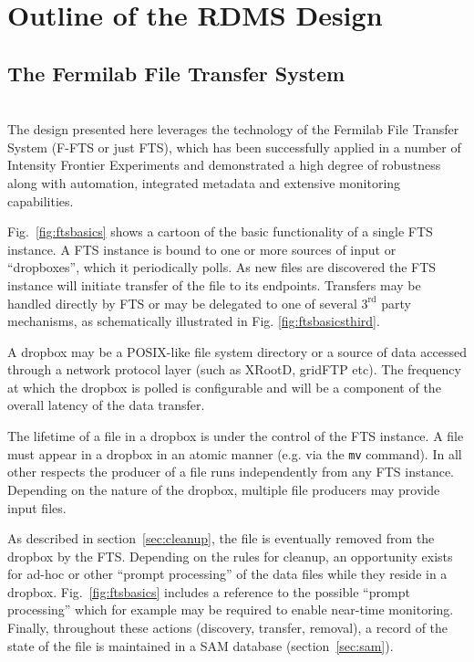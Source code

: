 \documentclass[12pt]{article}
\begin{document}
 





\section{Outline of the RDMS Design}


\subsection{The Fermilab File Transfer System}
\ \\
The design presented here leverages the technology of the Fermilab
File Transfer System (F-FTS or just FTS), which has been successfully
applied in a number of Intensity Frontier Experiments and demonstrated
a high degree of robustness along with automation, integrated metadata
and extensive monitoring capabilities.

Fig.~\ref{fig:ftsbasics} shows a cartoon of the basic functionality
of a single FTS instance.  A FTS instance is bound to one or more
sources of input or ``dropboxes'', which it  periodically polls.
As new files are discovered the FTS instance will initiate transfer of the file to its endpoints.
Transfers may be handled directly by FTS or may be delegated to one of
several $3^\mathrm{rd}$ party mechanisms, as schematically illustrated
in  Fig. \ref{fig:ftsbasicsthird}.

A dropbox may be a POSIX-like file system directory or a source of data accessed
through a network protocol layer (such as  XRootD, gridFTP etc). The frequency at
which the dropbox is polled is configurable and will be a component of the overall latency
of the data transfer.

The lifetime of a file in a dropbox is under the control of the FTS
instance.  A file must appear in a dropbox in an atomic manner
(e.g. via the \texttt{mv} command). In all other respects the producer
of a file runs independently from any FTS instance.  Depending on the
nature of the dropbox, multiple file producers may provide input files.


As described in section~\ref{sec:cleanup}, the file is eventually removed from the
dropbox by the FTS.  Depending on the rules for cleanup, an opportunity
exists for ad-hoc or other ``prompt processing'' of the data files while
they reside in a dropbox. Fig.~\ref{fig:ftsbasics} includes a reference to the possible
``prompt processing'' which for example may be required to enable
near-time monitoring. Finally, throughout these actions (discovery, transfer,
removal), a record of the state of the file is maintained in a SAM
database (section~\ref{sec:sam}).
\end{document}
